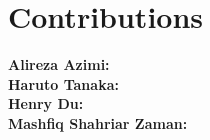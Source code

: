 \documentclass{article}
\theoremstyle{plain}
\theoremstyle{definition}
\theoremstyle{remark}
\begin{document}
\section{Contributions}
\textbf{Alireza Azimi:}\\
\textbf{Haruto Tanaka:}\\
\textbf{Henry Du:}\\
\textbf{Mashfiq Shahriar Zaman:}\\

\nocite{Ando2005, Ando2006, Ando2007, Ando2008}



\end{document}
